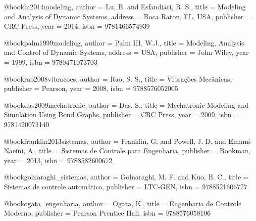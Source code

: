 @book{lu2014modeling,
  author = {Lu, B. and Esfandiari, R. S.},
  title = {Modeling and Analysis of Dynamic Systems},
  address = {Boca Raton, FL, USA},
  publisher = {CRC Press},
  year = {2014},
  isbn = {9781466574939}
}

@book{palm1999modeling,
  author = {Palm III, W.J.},
  title = {Modeling, Analysis and Control of Dynamic Systems},
  address = {USA},
  publisher = {John Wiley},
  year = {1999},
  isbn = {9780471073703}
}

@book{rao2008vibracoes,
  author = {Rao, S. S.},
  title = {Vibrações Mecânicas},
  publisher = {Pearson},
  year = {2008},
  isbn = {9788576052005}
}

@book{das2009mechatronic,
  author = {Das, S.},
  title = {Mechatronic Modeling and Simulation Using Bond Graphs},
  publisher = {CRC Press},
  year = {2009},
  isbn = {9781420073140}
}

@book{franklin2013sistemas,
  author = {Franklin, G. and Powell, J. D. and Emami-Naeini, A.},
  title = {Sistemas de Controle para Engenharia},
  publisher = {Bookman},
  year = {2013},
  isbn = {9788582600672}
}

@book{golnaraghi_sistemas,
  author = {Golnaraghi, M. F. and Kuo, B. C.},
  title = {Sistemas de controle automático},
  publisher = {LTC-GEN},
  isbn = {9788521606727}
}

@book{ogata_engenharia,
  author = {Ogata, K.},
  title = {Engenharia de Controle Moderno},
  publisher = {Pearson Prentice Hall},
  isbn = {9788576058106}
} 